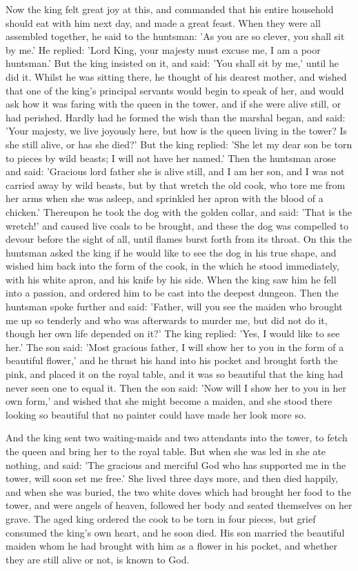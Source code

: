 \documentclass[12pt]{book}
\begin{document}
Now the king felt great joy at this, and commanded that his entire
household should eat with him next day, and made a great feast. When
they were all assembled together, he said to the huntsman: 'As you are
so clever, you shall sit by me.' He replied: 'Lord King, your majesty
must excuse me, I am a poor huntsman.' But the king insisted on it,
and said: 'You shall sit by me,' until he did it. Whilst he was
sitting there, he thought of his dearest mother, and wished that one
of the king's principal servants would begin to speak of her, and
would ask how it was faring with the queen in the tower, and if she
were alive still, or had perished. Hardly had he formed the wish than
the marshal began, and said: 'Your majesty, we live joyously here, but
how is the queen living in the tower? Is she still alive, or has she
died?' But the king replied: 'She let my dear son be torn to pieces by
wild beasts; I will not have her named.' Then the huntsman arose and
said: 'Gracious lord father she is alive still, and I am her son, and
I was not carried away by wild beasts, but by that wretch the old
cook, who tore me from her arms when she was asleep, and sprinkled her
apron with the blood of a chicken.' Thereupon he took the dog with the
golden collar, and said: 'That is the wretch!' and caused live coals
to be brought, and these the dog was compelled to devour before the
sight of all, until flames burst forth from its throat. On this the
huntsman asked the king if he would like to see the dog in his true
shape, and wished him back into the form of the cook, in the which he
stood immediately, with his white apron, and his knife by his side.
When the king saw him he fell into a passion, and ordered him to be
cast into the deepest dungeon. Then the huntsman spoke further and
said: 'Father, will you see the maiden who brought me up so tenderly
and who was afterwards to murder me, but did not do it, though her own
life depended on it?' The king replied: 'Yes, I would like to see
her.' The son said: 'Most gracious father, I will show her to you in
the form of a beautiful flower,' and he thrust his hand into his
pocket and brought forth the pink, and placed it on the royal table,
and it was so beautiful that the king had never seen one to equal it.
Then the son said: 'Now will I show her to you in her own form,' and
wished that she might become a maiden, and she stood there looking so
beautiful that no painter could have made her look more so.

And the king sent two waiting-maids and two attendants into the tower,
to fetch the queen and bring her to the royal table. But when she was
led in she ate nothing, and said: 'The gracious and merciful God who
has supported me in the tower, will soon set me free.' She lived three
days more, and then died happily, and when she was buried, the two
white doves which had brought her food to the tower, and were angels
of heaven, followed her body and seated themselves on her grave. The
aged king ordered the cook to be torn in four pieces, but grief
consumed the king's own heart, and he soon died. His son married the
beautiful maiden whom he had brought with him as a flower in his
pocket, and whether they are still alive or not, is known to God.
\end{document}
